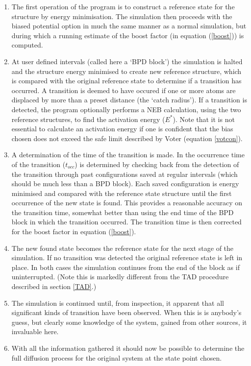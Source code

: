 \begin{enumerate}
\item The first operation of the program is to construct a reference 
state for the structure by energy minimisation.
The simulation then proceeds with the biased potential option in much
the same manner as a normal simulation, but during which a running
estimate of the boost factor (in equation (\ref{boost})) is computed. 
\item At user defined intervals (called here a `BPD block') the 
simulation is halted and the structure energy minimised to create new
reference structure, which is compared with the original reference
state to determine if a transition has occurred. A transition is
deemed to have occured if one or more atoms are displaced by more than
a preset distance (the `catch radius').  If a transition is
detected, the program optionally performs a NEB calculation, using the 
two reference structures, to find the activation energy ($E^{*}$). 
Note that it is not essential to calculate an activation energy if one is
confident that the bias chosen does not exceed the safe limit described by
Voter (equation \ref{votcon}).
\item A determination of the time of the transition is made.
In \D{} the occurrence time of the transition ($t_{occ}$) is determined
by checking back from the detection of the transition through past
configurations saved at regular intervals (which should be much less
than a BPD block).  Each saved configuration is energy minimised and
compared with the reference state structure until the first occurrence
of the new state is found. This provides a reasonable accuracy on the
transition time, somewhat better than using the end time of the BPD
block in which the transition occurred. The transition time is
then corrected for the boost factor in equation (\ref{boost}).
\item The new found state becomes the reference state for the next stage of
the simulation. If no transition was detected the original reference state is
left in place.  In both cases the simulation continues
from the end of the block as if uninterrupted. (Note this 
is markedly different from the TAD procedure
described in section \ref{TAD}.)
\item The simulation is continued until, from inspection, it apparent 
that all significant kinds of transition have been observed. When this
is is anybody's guess, but clearly some knowledge of the system,
gained from other sources, it invaluable here.
\item With all the information gathered it should now be possible to 
determine the full diffusion process for the original system at the
state point chosen.
\end{enumerate}

